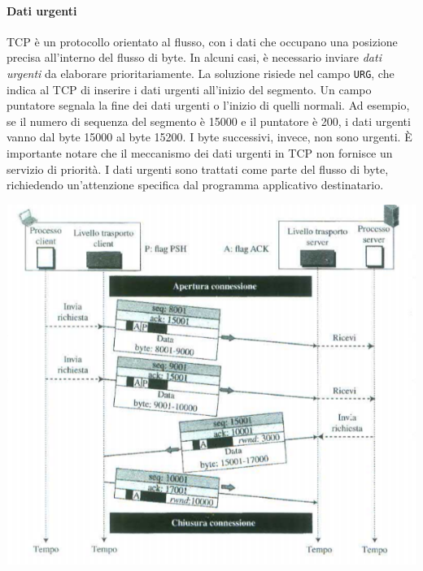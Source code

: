 \documentclass[12pt]{report}
\begin{document}
	\paragraph{Dati urgenti}
	TCP è un protocollo orientato al flusso, con i dati che occupano una posizione precisa all'interno del flusso di byte. In alcuni casi, è necessario inviare \textit{dati urgenti} da elaborare prioritariamente. La soluzione risiede nel campo \texttt{URG}, che indica al TCP di inserire i dati urgenti all'inizio del segmento. Un campo puntatore segnala la fine dei dati urgenti o l'inizio di quelli normali. Ad esempio, se il numero di sequenza del segmento è 15000 e il puntatore è 200, i dati urgenti vanno dal byte 15000 al byte 15200. I byte successivi, invece, non sono urgenti.
	È importante notare che il meccanismo dei dati urgenti in TCP non fornisce un servizio di priorità. I dati urgenti sono trattati come parte del flusso di byte, richiedendo un'attenzione specifica dal programma applicativo destinatario.
	\begin{center}
		\includegraphics[scale=0.6]{assets/trasf.png}
	\end{center}
\end{document}
